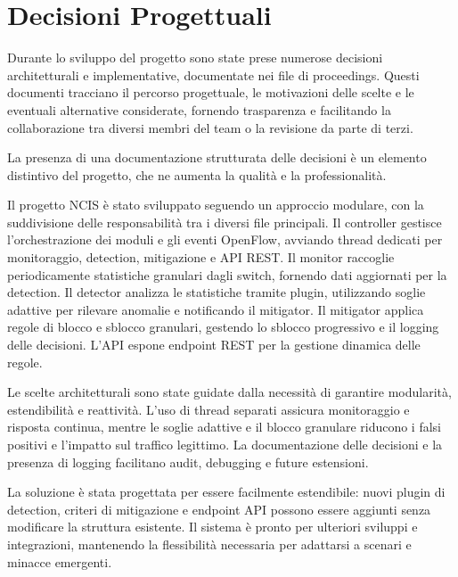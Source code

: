 \section{Decisioni Progettuali}
Durante lo sviluppo del progetto sono state prese numerose decisioni architetturali e implementative, documentate nei file di proceedings. Questi documenti tracciano il percorso progettuale, le motivazioni delle scelte e le eventuali alternative considerate, fornendo trasparenza e facilitando la collaborazione tra diversi membri del team o la revisione da parte di terzi.\par
La presenza di una documentazione strutturata delle decisioni è un elemento distintivo del progetto, che ne aumenta la qualità e la professionalità.

Il progetto NCIS è stato sviluppato seguendo un approccio modulare, con la suddivisione delle responsabilità tra i diversi file principali. Il controller gestisce l’orchestrazione dei moduli e gli eventi OpenFlow, avviando thread dedicati per monitoraggio, detection, mitigazione e API REST. Il monitor raccoglie periodicamente statistiche granulari dagli switch, fornendo dati aggiornati per la detection. Il detector analizza le statistiche tramite plugin, utilizzando soglie adattive per rilevare anomalie e notificando il mitigator. Il mitigator applica regole di blocco e sblocco granulari, gestendo lo sblocco progressivo e il logging delle decisioni. L’API espone endpoint REST per la gestione dinamica delle regole.\par
Le scelte architetturali sono state guidate dalla necessità di garantire modularità, estendibilità e reattività. L’uso di thread separati assicura monitoraggio e risposta continua, mentre le soglie adattive e il blocco granulare riducono i falsi positivi e l’impatto sul traffico legittimo. La documentazione delle decisioni e la presenza di logging facilitano audit, debugging e future estensioni.\par
La soluzione è stata progettata per essere facilmente estendibile: nuovi plugin di detection, criteri di mitigazione e endpoint API possono essere aggiunti senza modificare la struttura esistente. Il sistema è pronto per ulteriori sviluppi e integrazioni, mantenendo la flessibilità necessaria per adattarsi a scenari e minacce emergenti.
